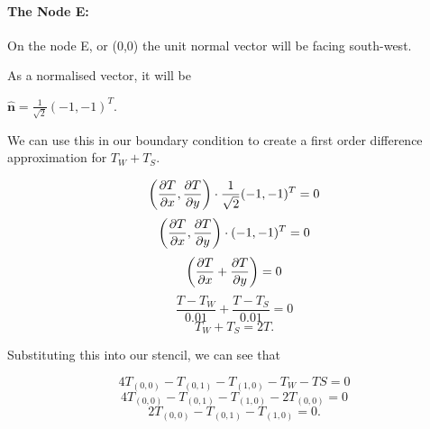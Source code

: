 \documentclass[12pt,a4paper]{article}
\begin{document}
\paragraph*{The Node E:}
On the node E, or (0,0) the unit normal vector will be facing south-west.
\begin{center}
\end{center}
As a normalised vector, it will be 
\begin{center}
    $\hat{\textbf{n}} = \frac{1}{\sqrt{2}}(-1,-1)^T$.
\end{center}
We can use this in our boundary condition to create a first order difference approximation for $T_W + T_S$.
\begin{center}
  \[\bigg{(}\frac{\partial T}{\partial x},\frac{\partial T}{\partial y}\bigg{)}\cdot \frac{1}{\sqrt{2}}(-1,-1)^T = 0\]
  \[\bigg{(}\frac{\partial T}{\partial x},\frac{\partial T}{\partial y}\bigg{)}\cdot (-1,-1)^T = 0\]
  \[\bigg{(}\frac{\partial T}{\partial x}+\frac{\partial T}{\partial y}\bigg{)} = 0\]
  \[\frac{T-T_W}{0.01}+\frac{T-T_S}{0.01} = 0\]
  \[T_W+T_S=2T.\]
\end{center}
Substituting this into our stencil, we can see that 
\begin{center}
\[4T_{(0,0)}-T_{(0,1)}-T_{(1,0)}-T_{W}-T{S}=0\]
\[4T_{(0,0)}-T_{(0,1)}-T_{(1,0)}-2T_{(0,0)}=0\]
\[2T_{(0,0)}-T_{(0,1)}-T_{(1,0)}=0.\]
\end{center}
\end{document}
